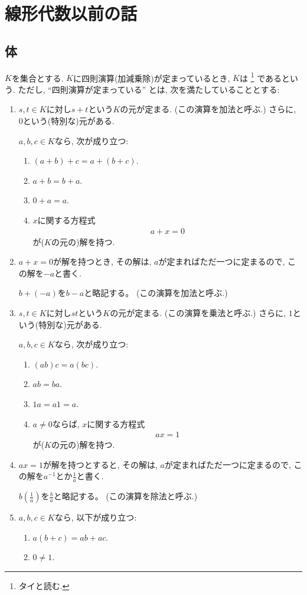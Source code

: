 

\chapter{線形代数以前の話}
\label{chap:prelim}
\section{体}
$K$を集合とする.
$K$に四則演算(加減乗除)が定まっているとき,
$K$は
\footnote{タイと読む.}
であるという.
ただし,
``四則演算が定まっている''
とは, 次を満たしていることとする:
\begin{enumerate}
\item
  $s,t\in K$に対し$s+t$という$K$の元が定まる.
  (この演算を加法と呼ぶ.)
  さらに, $0$という(特別な)元がある.

  $a,b,c\in K$なら, 次が成り立つ:
  \begin{enumerate}
  \item
    $(a+b)+c=a+(b+c)$.
  \item
    $a+b=b+a$.
  \item
    $0+a=a$.
  \item
    $x$に関する方程式
    \begin{align*}
      a+x=0
    \end{align*}
    が($K$の元の)解を持つ.
  \end{enumerate}
\item
  $a+x=0$が解を持つとき,
  その解は,
  $a$が定まればただ一つに定まるので,
  この解を$-a$と書く.

  $b+(-a)$を$b-a$と略記する。
  (この演算を加法と呼ぶ.)

\item
  $s,t\in K$に対し$st$という$K$の元が定まる.
  (この演算を乗法と呼ぶ.)
  さらに, $1$という(特別な)元がある.

  $a,b,c\in K$なら, 次が成り立つ:
  \begin{enumerate}
  \item
    $(ab)c=a(bc)$.
  \item
  \label{def:field:item:comring}
    $ab=ba$.
  \item
    $1a=a1=a$.
  \item
  \label{def:field:item:invertible}
    $a\neq 0$ならば,
    $x$に関する方程式
    \begin{align*}
      ax=1
    \end{align*}
    が($K$の元の)解を持つ.
  \end{enumerate}

\item
  $ax=1$が解を持つとすると,
  その解は,
  $a$が定まればただ一つに定まるので,
  この解を$a^{-1}$とか$\frac{1}{a}$と書く.

  $b(\frac{1}{a})$を$\frac{b}{a}$と略記する。
  (この演算を除法と呼ぶ.)

\item
  $a,b,c\in K$なら, 以下が成り立つ:
  \begin{enumerate}
  \item $a(b+c)=ab+ac$.
  \item $0\neq 1$.
  \end{enumerate}
\end{enumerate}
